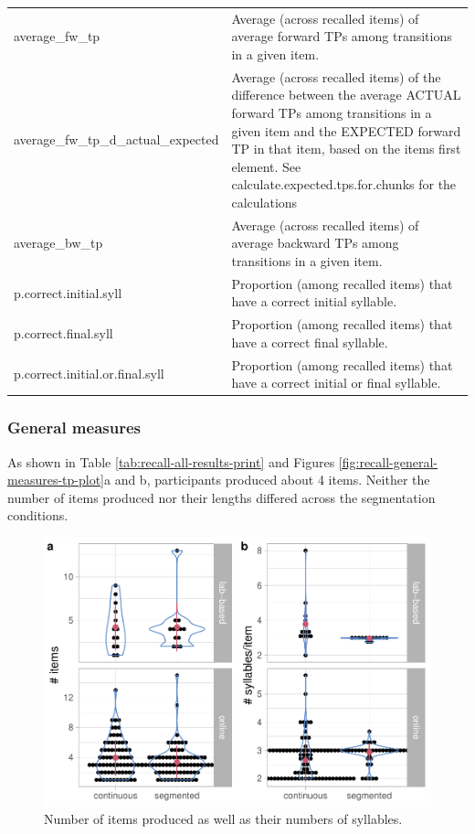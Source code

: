 \documentclass[
]{article}
\begin{document}
\begin{table}[!h]
{\begin{tabular}[t]{l>{\raggedright\arraybackslash}p{30em}}
average\_fw\_tp & Average (across recalled items) of average forward TPs among transitions in a given item.\\
average\_fw\_tp\_d\_actual\_expected & Average (across recalled items) of the difference between the average ACTUAL forward TPs among transitions in a given item and the EXPECTED forward TP in that item, based on the items first element. See calculate.expected.tps.for.chunks for the calculations\\
average\_bw\_tp & Average (across recalled items) of average backward TPs among transitions in a given item.\\
\addlinespace
p.correct.initial.syll & Proportion (among recalled items) that have a correct initial syllable.\\
p.correct.final.syll & Proportion (among recalled items) that have a correct final syllable.\\
p.correct.initial.or.final.syll & Proportion (among recalled items) that have a correct initial or final syllable.\\
\bottomrule
\end{tabular}}
\end{table}

\hypertarget{general-measures}{%
\subsubsection{General measures}\label{general-measures}}

As shown in Table \ref{tab:recall-all-results-print} and Figures
\ref{fig:recall-general-measures-tp-plot}a and b, participants produced
about 4 items. Neither the number of items produced nor their lengths
differed across the segmentation conditions.

\begin{figure}

{\centering \includegraphics[width=0.8\linewidth]{segmentation_recall_combined_for_revision2_files/figure-latex/recall-general-measures-plot-1} 

}

\caption{Number of items produced as well as their numbers of syllables.}\label{fig:recall-general-measures-plot}
\end{figure}
\end{document}
